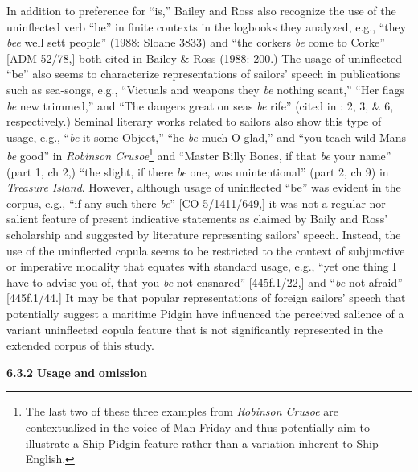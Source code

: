   In addition to preference for “is,” Bailey and Ross also recognize the use of the uninflected verb “be” in finite contexts in the logbooks they analyzed, e.g., “they \textit{bee} well sett people” (1988: Sloane 3833) and “the corkers \textit{be} come to Corke” [ADM 52/78,] both cited in Bailey \& Ross (1988: 200.) The usage of uninflected “be” also seems to characterize representations of sailors’ speech in publications such as sea-songs, e.g., “Victuals and weapons they \textit{be} nothing scant,” “Her flags \textit{be} new trimmed,” and “The dangers great on seas \textit{be} rife” (cited in \citealt{Palmer1986}: 2, 3, \& 6, respectively.) Seminal literary works related to sailors also show this type of usage, e.g., “\textit{be} it some Object,” “he \textit{be} much O glad,” and “you teach wild Mans \textit{be} good” in  \textit{Robinson Crusoe}\footnote{The last two of these three examples from \textit{Robinson Crusoe} are contextualized in the voice of Man Friday and thus potentially aim to illustrate a Ship Pidgin feature rather than a variation inherent to Ship English.}  and “Master Billy Bones, if that \textit{be} your name” (part 1, ch 2,) “the slight, if there \textit{be} one, was unintentional” (part 2, ch 9) in  \textit{Treasure Island}. However, although usage of uninflected “be” was evident in the corpus, e.g., “if any such there \textit{be}” [CO 5/1411/649,] it was not a regular nor salient feature of present indicative statements as claimed by Baily and Ross’ scholarship and suggested by literature representing sailors’ speech. Instead, the use of the uninflected copula seems to be restricted to the context of subjunctive or imperative modality that equates with standard usage, e.g., “yet one thing I have to advise you of, that you \textit{be} not ensnared” [445f.1/22,] and “\textit{be} not afraid” [445f.1/44.] It may be that popular representations of foreign sailors’ speech that potentially suggest a maritime Pidgin have influenced the perceived salience of a variant uninflected copula feature that is not significantly represented in the extended corpus of this study. 

  \textbf{6.3.2} \textbf{Usage} \textbf{and} \textbf{omission}  

